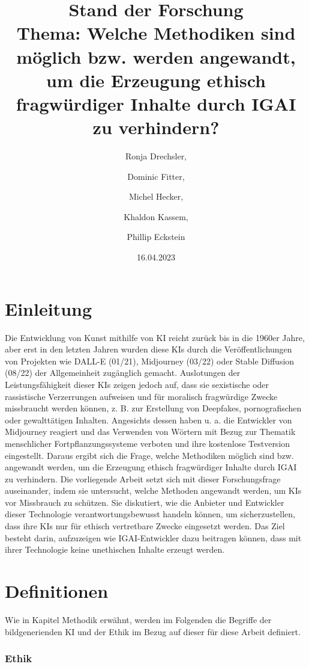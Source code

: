 \documentclass[12pt]{article}
\title{Stand der Forschung \\[1ex] \large Thema: Welche Methodiken sind möglich bzw. werden angewandt, um die Erzeugung ethisch fragwürdiger Inhalte durch IGAI zu verhindern?}
\date{16.04.2023}
\author{Ronja Drechsler, \and Dominic Fitter, \and Michel Hecker, \and Khaldon Kassem, \and Phillip Eckstein}
\begin{document}
\maketitle
\tableofcontents
\newpage

\chapter{Einleitung}

Die Entwicklung von Kunst mithilfe von KI reicht zurück bis in die 1960er Jahre\cite{Garcia}, aber erst in den letzten Jahren wurden diese KIs durch die Veröffentlichungen von Projekten wie DALL-E (01/21), Midjourney (03/22) oder Stable Diffusion (08/22) der Allgemeinheit zugänglich gemacht. Auslotungen der Leistungsfähigkeit dieser KIs zeigen jedoch auf, dass sie sexistische oder rassistische Verzerrungen aufweisen \cite{Schmidt}und für moralisch fragwürdige Zwecke missbraucht werden können, z. B. zur Erstellung von Deepfakes, pornografischen oder gewalttätigen Inhalten.\cite{Hadero}
Angesichts dessen haben u. a. die Entwickler von Midjourney reagiert und das Verwenden von Wörtern mit Bezug zur Thematik menschlicher Fortpflanzungssysteme verboten \cite{Heikkilae} und ihre kostenlose Testversion eingestellt. \cite{NelsonMidjourney} Daraus ergibt sich die Frage, welche Methodiken möglich sind bzw. angewandt werden, um die Erzeugung ethisch fragwürdiger Inhalte durch IGAI zu verhindern. 
Die vorliegende Arbeit setzt sich mit dieser Forschungsfrage auseinander, indem sie untersucht, welche Methoden angewandt werden, um KIs vor Missbrauch zu schützen. Sie diskutiert, wie die Anbieter und Entwickler dieser Technologie verantwortungsbewusst handeln können, um sicherzustellen, dass ihre KIs nur für ethisch vertretbare Zwecke eingesetzt werden. Das Ziel besteht darin, aufzuzeigen wie IGAI-Entwickler dazu beitragen können, dass mit ihrer Technologie keine unethischen Inhalte erzeugt werden.

 

\chapter{Definitionen}
Wie in Kapitel Methodik erwähnt, werden im Folgenden die Begriffe der bildgenerienden KI und der Ethik im Bezug auf dieser für diese Arbeit definiert.
\subsection{Ethik}\label{subsection:ethicsdefinition}
\end{document}
